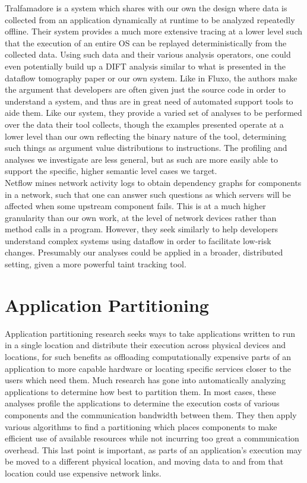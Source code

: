 \documentclass[msc,oneside]{ubcthesis}
\begin{document}
	Tralfamadore \cite{Lefebvre2012} is a system which shares with our own the design where data is collected from an application dynamically at runtime to be analyzed repeatedly offline. Their system provides a much more extensive tracing at a lower level such that the execution of an entire OS can be replayed deterministically from the collected data. Using such data and their various analysis operators, one could even potentially build up a DIFT analysis similar to what is presented in the dataflow tomography paper or our own system. Like in Fluxo, the authors make the argument that developers are often given just the source code in order to understand a system, and thus are in great need of automated support tools to aide them. Like our system, they provide a varied set of analyses to be performed over the data their tool collects, though the examples presented operate at a lower level than our own reflecting the binary nature of the tool, determining such things as argument value distributions to instructions. The profiling and analyses we investigate are less general, but as such are more easily able to support the specific, higher semantic level cases we target.\\
	
	Netflow \cite{Caracas2008} mines network activity logs to obtain dependency graphs for components in a network, such that one can answer such questions as which servers will be affected when some upstream component fails. This is at a much higher granularity than our own work, at the level of network devices rather than method calls in a program. However, they seek similarly to help developers understand complex systems using dataflow in order to facilitate low-risk changes. Presumably our analyses could be applied in a broader, distributed setting, given a more powerful taint tracking tool.

\section{Application Partitioning}

	Application partitioning research seeks ways to take applications written to run in a single location and distribute their execution across physical devices and locations, for such benefits as offloading computationally expensive parts of an application to more capable hardware or locating specific services closer to the users which need them. Much research has gone into automatically analyzing applications to determine how best to partition them. In most cases, these analyses profile the applications to determine the execution costs of various components and the communication bandwidth between them. They then apply various algorithms to find a partitioning which places components to make efficient use of available resources while not incurring too great a communication overhead. This last point is important, as parts of an application's execution may be moved to a different physical location, and moving data to and from that location could use expensive network links.\\
	
\end{document}
